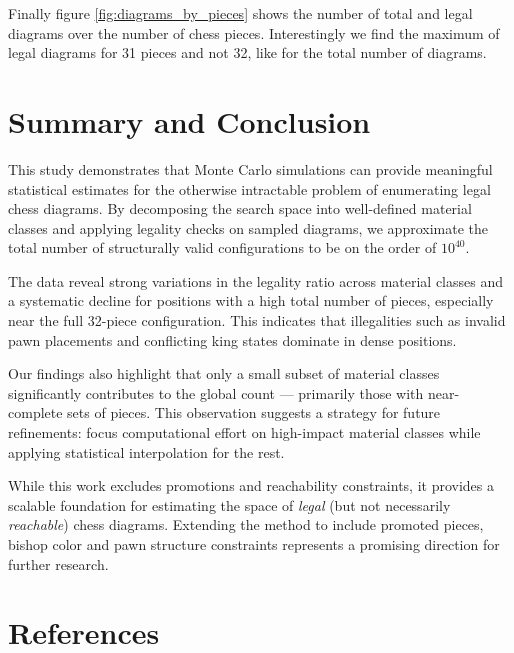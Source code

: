 \documentclass[12pt]{article}
\begin{document}
Finally figure \ref{fig:diagrams_by_pieces} shows the number of total and legal diagrams over the number of chess pieces. Interestingly we find the maximum of legal diagrams for 31 pieces and not 32, like for the total number of diagrams.

\section{Summary and Conclusion}

This study demonstrates that Monte Carlo simulations can provide meaningful statistical estimates for the otherwise intractable problem of enumerating legal chess diagrams. By decomposing the search space into well-defined material classes and applying legality checks on sampled diagrams, we approximate the total number of structurally valid configurations to be on the order of $10^{40}$.

The data reveal strong variations in the legality ratio across material classes and a systematic decline for positions with a high total number of pieces, especially near the full 32-piece configuration. This indicates that illegalities such as invalid pawn placements and conflicting king states dominate in dense positions.

Our findings also highlight that only a small subset of material classes significantly contributes to the global count — primarily those with near-complete sets of pieces. This observation suggests a strategy for future refinements: focus computational effort on high-impact material classes while applying statistical interpolation for the rest.

While this work excludes promotions and reachability constraints, it provides a scalable foundation for estimating the space of \emph{legal} (but not necessarily \emph{reachable}) chess diagrams. Extending the method to include promoted pieces, bishop color and pawn structure constraints represents a promising direction for further research.

\section{References}
\end{document}
